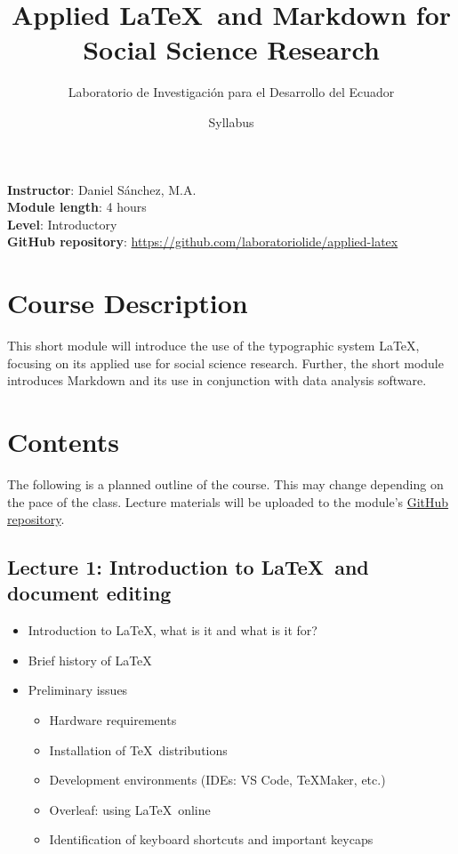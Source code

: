 \documentclass[a4paper,11pt]{article}
\title{Applied \LaTeX \ and Markdown for Social Science Research}
\author{Laboratorio de Investigación para el Desarrollo del Ecuador}
\date{Syllabus}
\begin{document}
\maketitle

\noindent \textbf{Instructor}: Daniel Sánchez, M.A. \\
\textbf{Module length}: 4 hours \\
\textbf{Level}: Introductory \\
\textbf{GitHub repository}: \url{https://github.com/laboratoriolide/applied-latex}

\section{Course Description}

This short module will introduce the use of the typographic system \LaTeX, focusing on its applied use for social science research. Further, the short module introduces Markdown and its use in conjunction with data analysis software. 

\section{Contents}

The following is a planned outline of the course. This may change depending on the pace of the
class. Lecture materials will be uploaded to the module's \href{https://github.com/laboratoriolide/applied-latex}{GitHub repository}.

\subsection{Lecture 1: Introduction to \LaTeX \ and document editing}

\begin{itemize}
    \item Introduction to \LaTeX, what is it and what is it for?
    \item Brief history of \LaTeX
    \item Preliminary issues
    \begin{itemize}
        \item Hardware requirements
        \item Installation of \TeX \ distributions
        \item Development environments (IDEs: VS Code, \TeX Maker, etc.)
        \item Overleaf: using \LaTeX \ online
        \item Identification of keyboard shortcuts and important keycaps
    \end{itemize}
\end{itemize}
\end{document}
